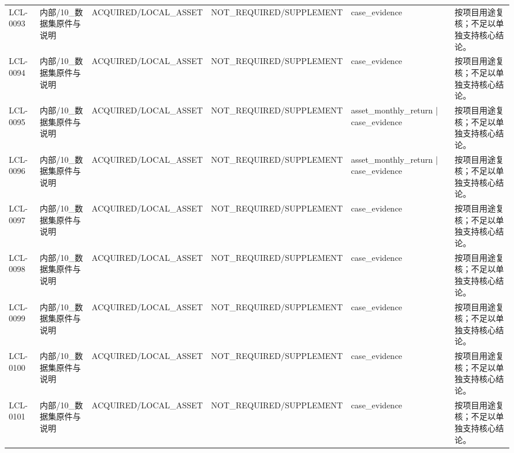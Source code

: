 \begin{landscape}
\begin{longtable}{p{1.8cm}p{2.6cm}p{2.6cm}p{2.6cm}p{4.8cm}p{7.2cm}}
LCL-0093 & 内部/\allowbreak{}10\_\allowbreak{}数据集原件与说明 & ACQUIRED/\allowbreak{}LOCAL\_\allowbreak{}ASSET & NOT\_\allowbreak{}REQUIRED/\allowbreak{}SUPPLEMENT & case\_\allowbreak{}evidence & 按项目用途复核；不足以单独支持核心结论。\\
LCL-0094 & 内部/\allowbreak{}10\_\allowbreak{}数据集原件与说明 & ACQUIRED/\allowbreak{}LOCAL\_\allowbreak{}ASSET & NOT\_\allowbreak{}REQUIRED/\allowbreak{}SUPPLEMENT & case\_\allowbreak{}evidence & 按项目用途复核；不足以单独支持核心结论。\\
LCL-0095 & 内部/\allowbreak{}10\_\allowbreak{}数据集原件与说明 & ACQUIRED/\allowbreak{}LOCAL\_\allowbreak{}ASSET & NOT\_\allowbreak{}REQUIRED/\allowbreak{}SUPPLEMENT & asset\_\allowbreak{}monthly\_\allowbreak{}return | case\_\allowbreak{}evidence & 按项目用途复核；不足以单独支持核心结论。\\
LCL-0096 & 内部/\allowbreak{}10\_\allowbreak{}数据集原件与说明 & ACQUIRED/\allowbreak{}LOCAL\_\allowbreak{}ASSET & NOT\_\allowbreak{}REQUIRED/\allowbreak{}SUPPLEMENT & asset\_\allowbreak{}monthly\_\allowbreak{}return | case\_\allowbreak{}evidence & 按项目用途复核；不足以单独支持核心结论。\\
LCL-0097 & 内部/\allowbreak{}10\_\allowbreak{}数据集原件与说明 & ACQUIRED/\allowbreak{}LOCAL\_\allowbreak{}ASSET & NOT\_\allowbreak{}REQUIRED/\allowbreak{}SUPPLEMENT & case\_\allowbreak{}evidence & 按项目用途复核；不足以单独支持核心结论。\\
LCL-0098 & 内部/\allowbreak{}10\_\allowbreak{}数据集原件与说明 & ACQUIRED/\allowbreak{}LOCAL\_\allowbreak{}ASSET & NOT\_\allowbreak{}REQUIRED/\allowbreak{}SUPPLEMENT & case\_\allowbreak{}evidence & 按项目用途复核；不足以单独支持核心结论。\\
LCL-0099 & 内部/\allowbreak{}10\_\allowbreak{}数据集原件与说明 & ACQUIRED/\allowbreak{}LOCAL\_\allowbreak{}ASSET & NOT\_\allowbreak{}REQUIRED/\allowbreak{}SUPPLEMENT & case\_\allowbreak{}evidence & 按项目用途复核；不足以单独支持核心结论。\\
LCL-0100 & 内部/\allowbreak{}10\_\allowbreak{}数据集原件与说明 & ACQUIRED/\allowbreak{}LOCAL\_\allowbreak{}ASSET & NOT\_\allowbreak{}REQUIRED/\allowbreak{}SUPPLEMENT & case\_\allowbreak{}evidence & 按项目用途复核；不足以单独支持核心结论。\\
LCL-0101 & 内部/\allowbreak{}10\_\allowbreak{}数据集原件与说明 & ACQUIRED/\allowbreak{}LOCAL\_\allowbreak{}ASSET & NOT\_\allowbreak{}REQUIRED/\allowbreak{}SUPPLEMENT & case\_\allowbreak{}evidence & 按项目用途复核；不足以单独支持核心结论。\\

\end{longtable}
\end{landscape}

